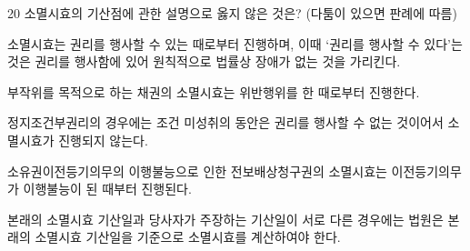 \begin{question}{20}
소멸시효의 기산점에 관한 설명으로 옳지 않은 것은? (다툼이 있으면 판례에 따름)
\begin{choices}
  \item 소멸시효는 권리를 행사할 수 있는 때로부터 진행하며, 이때 ‘권리를 행사할 수 있다’는 것은 권리를 행사함에 있어 원칙적으로 법률상 장애가 없는 것을 가리킨다.
  \item 부작위를 목적으로 하는 채권의 소멸시효는 위반행위를 한 때로부터 진행한다.
  \item 정지조건부권리의 경우에는 조건 미성취의 동안은 권리를 행사할 수 없는 것이어서 소멸시효가 진행되지 않는다.
  \item 소유권이전등기의무의 이행불능으로 인한 전보배상청구권의 소멸시효는 이전등기의무가 이행불능이 된 때부터 진행된다.
  \item 본래의 소멸시효 기산일과 당사자가 주장하는 기산일이 서로 다른 경우에는 법원은 본래의 소멸시효 기산일을 기준으로 소멸시효를 계산하여야 한다.
\end{choices}
\end{question}
